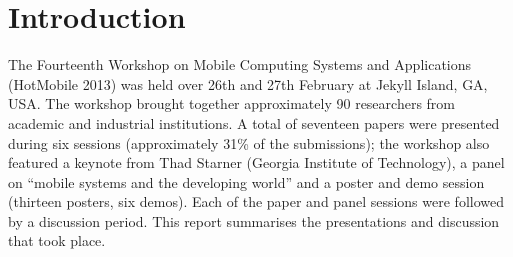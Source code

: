 \section{Introduction}
\label{sec:introduction}

The Fourteenth Workshop on Mobile Computing Systems and Applications (HotMobile 
2013) was held over 26th and 27th February at Jekyll Island, GA, USA. The workshop 
brought together approximately 90 researchers from academic and industrial 
institutions. A total of seventeen papers were presented during six
sessions (approximately 31\% of the submissions); the workshop
also featured a keynote from  Thad Starner (Georgia Institute of
Technology), a panel on ``mobile systems and the developing world'' and a
poster and demo session (thirteen posters, six demos). Each of the paper and
panel sessions were followed by a discussion period. This report
summarises the
presentations and discussion that took place.
